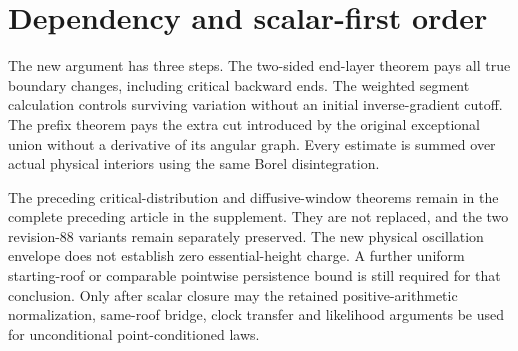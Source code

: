 \documentclass[11pt,reqno]{amsart}
\numberwithin{equation}{section}
\theoremstyle{definition}
\theoremstyle{remark}\newtheorem{remark}[theorem]{Remark}
\begin{document}
\section{Dependency and scalar-first order}
The new argument has three steps. The two-sided end-layer theorem pays
all true boundary changes, including critical backward ends. The
weighted segment calculation controls surviving variation without an
initial inverse-gradient cutoff. The prefix theorem pays the extra
cut introduced by the original exceptional union without a derivative
of its angular graph. Every estimate is summed over actual physical
interiors using the same Borel disintegration.

The preceding critical-distribution and diffusive-window theorems remain
in the complete preceding article in the supplement. They are not
replaced, and the two revision-88 variants remain separately preserved.
The new physical oscillation envelope does not establish zero
essential-height charge. A further uniform starting-roof or comparable
pointwise persistence bound is still required for that conclusion.
Only after scalar closure may the retained positive-arithmetic
normalization, same-roof bridge, clock transfer and likelihood arguments
be used for unconditional point-conditioned laws.


\end{document}
